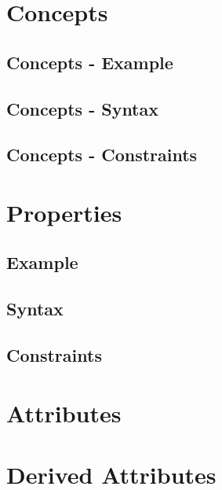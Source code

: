 \documentclass[a4paper,oneside,12pt, extrafontsizes]{memoir}
\theoremstyle{definition}
\theoremstyle{definition}
\theoremstyle{definition}
\theoremstyle{definition}
\begin{document}
\chapter{Concepts}
\label{ch:concepts}


\section{Concepts - Example}


\section{Concepts - Syntax}


\section{Concepts - Constraints}


\chapter{Properties}
\label{ch:properties}


\section{Example}


\section{Syntax}


\section{Constraints}


\chapter{Attributes}
\label{ch:attributes}


\chapter{Derived Attributes}
\label{ch:derived-attributes}

\end{document}
